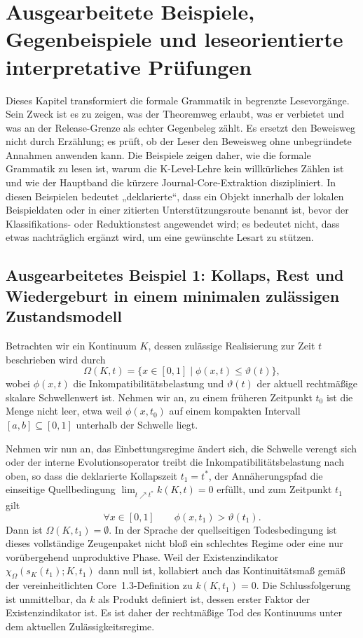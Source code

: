 \section{Ausgearbeitete Beispiele, Gegenbeispiele und leseorientierte interpretative Prüfungen}
\label{sec:oc13-worked-examples}

Dieses Kapitel transformiert die formale Grammatik in begrenzte Lesevorgänge. Sein Zweck ist es zu zeigen, was der Theoremweg erlaubt, was er verbietet und was an der Release-Grenze als echter Gegenbeleg zählt. Es ersetzt den Beweisweg nicht durch Erzählung; es prüft, ob der Leser den Beweisweg ohne unbegründete Annahmen anwenden kann. Die Beispiele zeigen daher, wie die formale Grammatik zu lesen ist, warum die K-Level-Lehre kein willkürliches Zählen ist und wie der Hauptband die kürzere Journal-Core-Extraktion diszipliniert.
In diesen Beispielen bedeutet „deklarierte“, dass ein Objekt innerhalb der lokalen Beispieldaten oder in einer zitierten Unterstützungsroute benannt ist, bevor der Klassifikations- oder Reduktionstest angewendet wird; es bedeutet nicht, dass etwas nachträglich ergänzt wird, um eine gewünschte Lesart zu stützen.

\subsection{Ausgearbeitetes Beispiel 1: Kollaps, Rest und Wiedergeburt in einem minimalen zulässigen Zustandsmodell}

Betrachten wir ein Kontinuum \(K\), dessen zulässige Realisierung zur Zeit \(t\) beschrieben wird durch
\[
\Omega(K,t) = \{x \in [0,1] \mid \phi(x,t) \le \vartheta(t)\},
\]
wobei \(\phi(x,t)\) die Inkompatibilitätsbelastung und \(\vartheta(t)\) der aktuell rechtmäßige skalare
Schwellenwert ist. Nehmen wir an, zu einem früheren Zeitpunkt \(t_0\) ist die Menge nicht leer, etwa weil
\(\phi(x,t_0)\) auf einem kompakten Intervall \([a,b]\subseteq [0,1]\) unterhalb der Schwelle liegt.

Nehmen wir nun an, das Einbettungsregime ändert sich, die Schwelle verengt sich oder der interne Evolutionsoperator treibt die Inkompatibilitätsbelastung nach oben, so dass die deklarierte Kollapszeit \(t_1=t^\ast\), der Annäherungspfad die einseitige Quellbedingung
\(\lim_{t\nearrow t^\ast} k(K,t)=0\) erfüllt, und zum Zeitpunkt \(t_1\) gilt
\[
\forall x \in [0,1] \qquad \phi(x,t_1) > \vartheta(t_1).
\]
Dann ist \(\Omega(K,t_1)=\emptyset\). In der Sprache der quellseitigen Todesbedingung ist dieses vollständige
Zeugenpaket nicht bloß ein schlechtes Regime oder eine nur vorübergehend unproduktive Phase. Weil der
Existenzindikator \(\chi_{\Omega}(s_K(t_1);K,t_1)\) dann null ist, kollabiert auch das
Kontinuitätsmaß gemäß der vereinheitlichten Core~1.3-Definition zu \(k(K,t_1)=0\). Die Schlussfolgerung ist
unmittelbar, da \(k\) als Produkt definiert ist, dessen erster Faktor der Existenzindikator ist. Es ist daher
der rechtmäßige Tod des Kontinuums unter dem aktuellen Zulässigkeitsregime.

